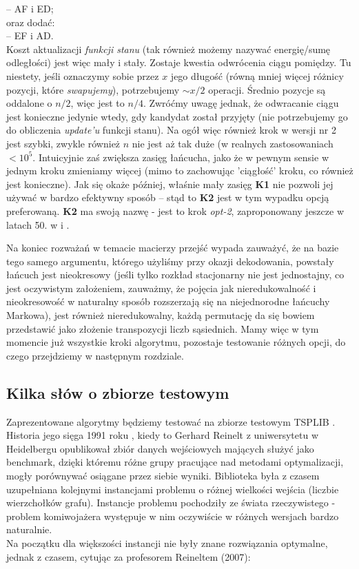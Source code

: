 \documentclass[a4paper]{article}
\theoremstyle{defn}
\theoremstyle{theorem}
\theoremstyle{lemma}
\theoremstyle{cor}
\theoremstyle{fact}
\begin{document}
\begin{enumerate}
– AF i ED;\\
oraz dodać:\\
– EF i AD.\\
Koszt aktualizacji \textit{funkcji stanu} (tak również możemy nazywać energię/sumę odległości) jest więc mały i stały. Zostaje kwestia odwrócenia ciągu pomiędzy. Tu niestety, jeśli oznaczymy sobie przez $x$ jego długość (równą mniej więcej różnicy pozycji, które \textit{swapujemy}), potrzebujemy $\sim x/2$ operacji. Średnio pozycje są oddalone o $n/2$, więc jest to $n/4$. Zwróćmy uwagę jednak, że odwracanie ciągu jest konieczne jedynie wtedy, gdy kandydat został przyjęty (nie potrzebujemy go do obliczenia \textit{update'u} funkcji stanu). Na ogół więc również krok w wersji nr 2 jest szybki, zwykle również $n$ nie jest aż tak duże (w realnych zastosowaniach $<10^5$. Intuicyjnie zaś zwiększa zasięg łańcucha, jako że w pewnym sensie w jednym kroku zmieniamy więcej (mimo to zachowując 'ciągłość' kroku, co również jest konieczne). Jak się okaże później, właśnie mały zasięg \textbf{K1}  nie pozwoli jej używać w bardzo efektywny sposób – stąd to \textbf{K2} jest w tym wypadku opcją preferowaną.
\textbf{K2} ma swoją nazwę - jest to krok \textit{opt-2}, zaproponowany jeszcze w latach 50. w \cite{2opt1} i \cite{2opt2}.
\end{enumerate}
Na koniec rozważań w temacie macierzy przejść wypada zauważyć, że na bazie tego samego argumentu, którego użyliśmy przy okazji dekodowania, powstały łańcuch jest nieokresowy (jeśli tylko rozkład stacjonarny nie jest jednostajny, co jest oczywistym założeniem, zauważmy, że pojęcia jak nieredukowalność i nieokresowość w naturalny sposób rozszerzają się na niejednorodne łańcuchy Markowa), jest również nieredukowalny, każdą permutację da się bowiem przedstawić jako złożenie transpozycji liczb sąsiednich.
Mamy więc w tym momencie już wszystkie kroki algorytmu, pozostaje testowanie różnych opcji, do czego przejdziemy w następnym rozdziale.

\subsection{Kilka słów o zbiorze testowym}
Zaprezentowane algorytmy będziemy testować na zbiorze testowym TSPLIB \cite{benchmark}. Historia jego sięga 1991 roku \cite{reinh}, kiedy to Gerhard Reinelt z uniwersytetu w Heidelbergu opublikował zbiór danych wejściowych mających służyć jako benchmark, dzięki któremu różne grupy pracujące nad metodami optymalizacji, mogły porównywać osiągane przez siebie wyniki. Biblioteka była z czasem uzupełniana kolejnymi instancjami problemu o różnej wielkości wejścia (liczbie wierzchołków grafu). Instancje problemu pochodziły ze świata rzeczywistego - problem komiwojażera występuje w nim oczywiście w różnych wersjach bardzo naturalnie. \\
Na początku dla większości instancji nie były znane rozwiązania optymalne, jednak z czasem, cytując za profesorem Reineltem (2007):
\end{document}
